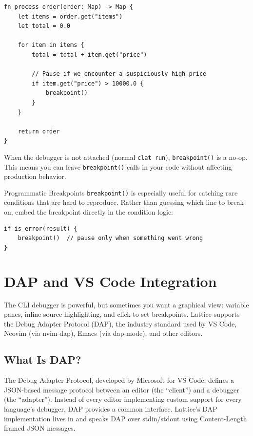 \begin{lstlisting}[language=Lattice, caption={Using breakpoint() in code}]
fn process_order(order: Map) -> Map {
    let items = order.get("items")
    let total = 0.0

    for item in items {
        total = total + item.get("price")

        // Pause if we encounter a suspiciously high price
        if item.get("price") > 10000.0 {
            breakpoint()
        }
    }

    return order
}
\end{lstlisting}

When the debugger is not attached (normal \lstinline|clat run|), \lstinline|breakpoint()| is a no-op.
This means you can leave \lstinline|breakpoint()| calls in your code without affecting production behavior.

\begin{tipbox}{Programmatic Breakpoints}
\lstinline|breakpoint()| is especially useful for catching rare conditions that are hard to reproduce.
Rather than guessing which line to break on, embed the breakpoint directly in the condition logic:
\begin{lstlisting}[language=Lattice]
if is_error(result) {
    breakpoint()  // pause only when something went wrong
}
\end{lstlisting}
\end{tipbox}

\section{DAP and VS Code Integration}\label{sec:dap}

The CLI debugger is powerful, but sometimes you want a graphical view: variable panes, inline source highlighting, and click-to-set breakpoints.
Lattice supports the Debug Adapter Protocol (DAP), the industry standard used by VS Code, Neovim (via nvim-dap), Emacs (via dap-mode), and other editors.

\subsection{What Is DAP?}\label{sec:what-is-dap}

The Debug Adapter Protocol, developed by Microsoft for VS Code, defines a JSON-based message protocol between an editor (the ``client'') and a debugger (the ``adapter'').
Instead of every editor implementing custom support for every language's debugger, DAP provides a common interface.
Lattice's DAP implementation lives in  and speaks DAP over stdin/stdout using Content-Length framed JSON messages.

